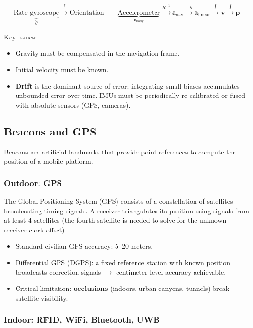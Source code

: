 \documentclass[11pt,a4paper]{article}
\theoremstyle{definition}
\theoremstyle{plain}
\theoremstyle{remark}
\begin{document}
\[
\underbrace{\text{Rate gyroscope}}_{\dot{\theta}} \xrightarrow{\int} \text{Orientation}
\qquad
\underbrace{\text{Accelerometer}}_{\mathbf{a}_\text{body}} \xrightarrow{R^{-1}} \mathbf{a}_\text{nav} \xrightarrow{-g} \mathbf{a}_\text{linear} \xrightarrow{\int} \mathbf{v} \xrightarrow{\int} \mathbf{p}
\]

Key issues:
\begin{itemize}
    \item Gravity must be compensated in the navigation frame.
    \item Initial velocity must be known.
    \item \textbf{Drift} is the dominant source of error: integrating small biases accumulates unbounded error over time. IMUs must be periodically re-calibrated or fused with absolute sensors (GPS, cameras).
\end{itemize}

\subsection{Beacons and GPS}

Beacons are artificial landmarks that provide point references to compute the position of a mobile platform.

\subsubsection*{Outdoor: GPS}

The Global Positioning System (GPS) consists of a constellation of satellites broadcasting timing signals. A receiver triangulates its position using signals from at least 4 satellites (the fourth satellite is needed to solve for the unknown receiver clock offset).

\begin{itemize}
    \item Standard civilian GPS accuracy: 5--20 meters.
    \item Differential GPS (DGPS): a fixed reference station with known position broadcasts correction signals $\to$ centimeter-level accuracy achievable.
    \item Critical limitation: \textbf{occlusions} (indoors, urban canyons, tunnels) break satellite visibility.
\end{itemize}

\subsubsection*{Indoor: RFID, WiFi, Bluetooth, UWB}
\end{document}
